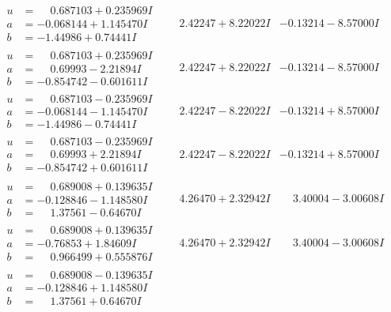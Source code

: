\documentclass[1p]{elsarticle_modified}
\theoremstyle{definition}
\begin{document}
$$\begin{array}{c|c|c}
\begin{aligned}
u &= \phantom{-}0.687103 + 0.235969 I \\
a &= -0.068144 + 1.145470 I \\
b &= -1.44986 + 0.74441 I\end{aligned}
 & \phantom{-}2.42247 + 8.22022 I & -0.13214 - 8.57000 I \\ \hline\begin{aligned}
u &= \phantom{-}0.687103 + 0.235969 I \\
a &= \phantom{-}0.69993 - 2.21894 I \\
b &= -0.854742 - 0.601611 I\end{aligned}
 & \phantom{-}2.42247 + 8.22022 I & -0.13214 - 8.57000 I \\ \hline\begin{aligned}
u &= \phantom{-}0.687103 - 0.235969 I \\
a &= -0.068144 - 1.145470 I \\
b &= -1.44986 - 0.74441 I\end{aligned}
 & \phantom{-}2.42247 - 8.22022 I & -0.13214 + 8.57000 I \\ \hline\begin{aligned}
u &= \phantom{-}0.687103 - 0.235969 I \\
a &= \phantom{-}0.69993 + 2.21894 I \\
b &= -0.854742 + 0.601611 I\end{aligned}
 & \phantom{-}2.42247 - 8.22022 I & -0.13214 + 8.57000 I \\ \hline\begin{aligned}
u &= \phantom{-}0.689008 + 0.139635 I \\
a &= -0.128846 - 1.148580 I \\
b &= \phantom{-}1.37561 - 0.64670 I\end{aligned}
 & \phantom{-}4.26470 + 2.32942 I & \phantom{-}3.40004 - 3.00608 I \\ \hline\begin{aligned}
u &= \phantom{-}0.689008 + 0.139635 I \\
a &= -0.76853 + 1.84609 I \\
b &= \phantom{-}0.966499 + 0.555876 I\end{aligned}
 & \phantom{-}4.26470 + 2.32942 I & \phantom{-}3.40004 - 3.00608 I \\ \hline\begin{aligned}
u &= \phantom{-}0.689008 - 0.139635 I \\
a &= -0.128846 + 1.148580 I \\
b &= \phantom{-}1.37561 + 0.64670 I\end{aligned}

\end{array}$$
\end{document}
